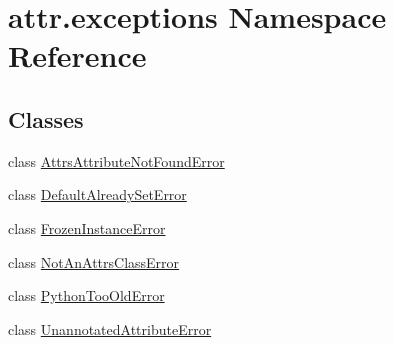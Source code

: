 \hypertarget{namespaceattr_1_1exceptions}{}\section{attr.\+exceptions Namespace Reference}
\label{namespaceattr_1_1exceptions}
\subsection*{Classes}
\begin{DoxyCompactItemize}
\item 
class \hyperlink{classattr_1_1exceptions_1_1_attrs_attribute_not_found_error}{Attrs\+Attribute\+Not\+Found\+Error}
\item 
class \hyperlink{classattr_1_1exceptions_1_1_default_already_set_error}{Default\+Already\+Set\+Error}
\item 
class \hyperlink{classattr_1_1exceptions_1_1_frozen_instance_error}{Frozen\+Instance\+Error}
\item 
class \hyperlink{classattr_1_1exceptions_1_1_not_an_attrs_class_error}{Not\+An\+Attrs\+Class\+Error}
\item 
class \hyperlink{classattr_1_1exceptions_1_1_python_too_old_error}{Python\+Too\+Old\+Error}
\item 
class \hyperlink{classattr_1_1exceptions_1_1_unannotated_attribute_error}{Unannotated\+Attribute\+Error}
\end{DoxyCompactItemize}
